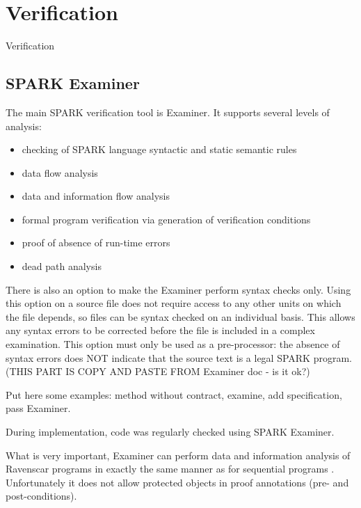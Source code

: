 
\cleardoublepage

\chapter{Verification}
\label{verification}

Verification



\section{SPARK Examiner}

The main SPARK verification tool is Examiner. It supports several levels of analysis:
\begin{itemize}
	\item checking of SPARK language syntactic and static semantic rules
	\item data flow analysis
	\item data and information flow analysis
	\item formal program verification via generation of verification conditions
	\item proof of absence of run-time errors
	\item dead path analysis
\end{itemize}

There is also an option to make the Examiner perform syntax checks only. Using this option on a source file does not require access to any other units on which the file depends, so files can be syntax checked on an individual basis. This allows any syntax errors to be corrected before the file is included in a complex examination.  This option must only be used as a pre-processor: the absence of syntax errors does NOT indicate that the source text is a legal SPARK program. \cite{Examiner:Online} (THIS PART IS COPY AND PASTE FROM Examiner doc - is it ok?)

Put here some examples: method without contract, examine, add specification, pass Examiner.

During implementation, code was regularly checked using SPARK Examiner.

What is very important, Examiner can perform data and information analysis of Ravenscar programs in exactly the same manner as for sequential programs \cite{Ravenscar:Online}. Unfortunately it does not allow protected objects in proof annotations (pre- and post-conditions).

